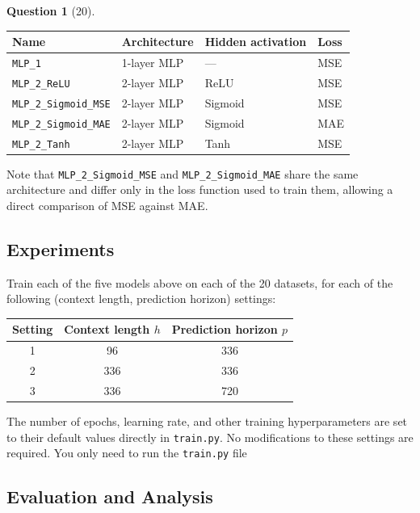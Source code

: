 \documentclass[12pt]{article}
\theoremstyle{definition}
\newtheorem{exercise}{Question}%
\begin{document}
\begin{exercise}[20]
{\begin{center}
\begin{tabular}{@{}llll@{}}
\toprule
\textbf{Name} & \textbf{Architecture} & \textbf{Hidden activation} & \textbf{Loss} \\
\midrule
\texttt{MLP\_1}              & 1-layer MLP & --- & MSE \\
\texttt{MLP\_2\_ReLU}        & 2-layer MLP & ReLU & MSE \\
\texttt{MLP\_2\_Sigmoid\_MSE} & 2-layer MLP & Sigmoid & MSE \\
\texttt{MLP\_2\_Sigmoid\_MAE} & 2-layer MLP & Sigmoid & MAE \\
\texttt{MLP\_2\_Tanh}        & 2-layer MLP & Tanh & MSE \\
\bottomrule
\end{tabular}
\end{center}

\noindent Note that \texttt{MLP\_2\_Sigmoid\_MSE} and \texttt{MLP\_2\_Sigmoid\_MAE} share the same
architecture and differ only in the loss function used to train them, allowing a direct
comparison of MSE against MAE.

\subsection*{Experiments}

Train each of the five models above on each of the 20 datasets, for each of the following
(context length, prediction horizon) settings: 

\begin{center}
\begin{tabular}{@{}ccc@{}}
\toprule
\textbf{Setting} & \textbf{Context length $h$} & \textbf{Prediction horizon $p$} \\
\midrule
1 & 96  & 336 \\
2 & 336 & 336 \\
3 & 336 & 720 \\
\bottomrule
\end{tabular}
\end{center}

The number of epochs, learning rate, and other training hyperparameters are set to their default values directly in \texttt{train.py}. No modifications to these settings are required.
You only need to run the \texttt{train.py} file

\subsection*{Evaluation and Analysis}

}
\end{exercise}
\end{document}
